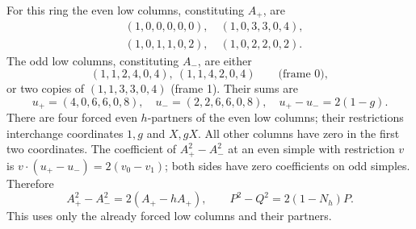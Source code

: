 \documentclass[10pt]{article}
\begin{document}
For this ring the even low columns, constituting $A_+$, are
\[
 \begin{split}
 &(1,0,0,0,0,0),\quad(1,0,3,3,0,4),\\
 &(1,0,1,1,0,2),\quad(1,0,2,2,0,2).
 \end{split}
\]
The odd low columns, constituting $A_-$, are either
\[
 (1,1,2,4,0,4),\ (1,1,4,2,0,4) \qquad\text{(frame 0)},
\]
or two copies of $(1,1,3,3,0,4)$ (frame 1). Their sums are
\[
 u_+=(4,0,6,6,0,8),\quad u_-=(2,2,6,6,0,8),
 \quad u_+-u_-=2(1-g).
\]
There are four forced even $h$-partners of the even low columns; their restrictions interchange coordinates $1,g$ and $X,gX$. All other columns have zero in the first two coordinates. The coefficient of $A_+^2-A_-^2$ at an even simple with restriction $v$ is $v\cdot(u_+-u_-)=2(v_0-v_1)$; both sides have zero coefficients on odd simples. Therefore
\begin{equation}\label{eq:square}
 A_+^2-A_-^2=2(A_+-hA_+),\qquad
 P^2-Q^2=2(1-N_h)P.
\end{equation}
This uses only the already forced low columns and their partners.
\end{document}
